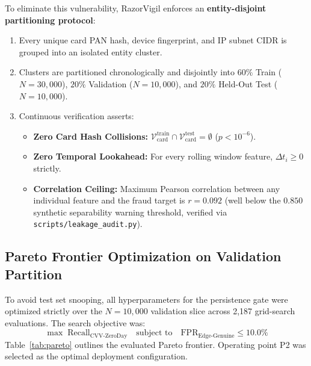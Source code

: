 \documentclass[conference]{IEEEtran}
\begin{document}
To eliminate this vulnerability, RazorVigil enforces an \textbf{entity-disjoint partitioning protocol}:
\begin{enumerate}
    \item Every unique card PAN hash, device fingerprint, and IP subnet CIDR is grouped into an isolated entity cluster.
    \item Clusters are partitioned chronologically and disjointly into $60\%$ Train ($N=30{,}000$), $20\%$ Validation ($N=10{,}000$), and $20\%$ Held-Out Test ($N=10{,}000$).
    \item Continuous verification asserts:
    \begin{itemize}
        \item \textbf{Zero Card Hash Collisions:} $\mathcal{V}_{\text{card}}^{\text{train}} \cap \mathcal{V}_{\text{card}}^{\text{test}} = \emptyset$ ($p < 10^{-6}$).
        \item \textbf{Zero Temporal Lookahead:} For every rolling window feature, $\Delta t_i \ge 0$ strictly.
        \item \textbf{Correlation Ceiling:} Maximum Pearson correlation between any individual feature and the fraud target is $r = 0.092$ (well below the $0.850$ synthetic separability warning threshold, verified via \texttt{scripts/leakage\_audit.py}).
    \end{itemize}
\end{enumerate}

\subsection{Pareto Frontier Optimization on Validation Partition}
\label{sec:pareto}
To avoid test set snooping, all hyperparameters for the persistence gate were optimized strictly over the $N=10{,}000$ validation slice across 2,187 grid-search evaluations. The search objective was:
\begin{equation}
    \max \; \text{Recall}_{\text{CVV-ZeroDay}} \quad \text{subject to} \quad \text{FPR}_{\text{Edge-Genuine}} \le 10.0\%
\end{equation}
Table~\ref{tab:pareto} outlines the evaluated Pareto frontier. Operating point P2 was selected as the optimal deployment configuration.

\begin{table}[h]
\caption{Validation Pareto Frontier for Persistence Gate}
\setlength{\tabcolsep}{3pt}
\footnotesize
\label{tab:pareto}
\centering\small
{}
\end{table}
\end{document}
